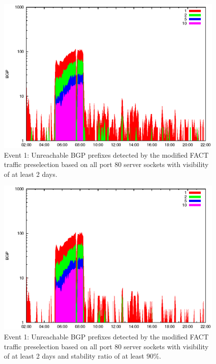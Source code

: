 \begin{figure}
	[p] \centering 
	\includegraphics[width=0.75\linewidth]{images/events/2010_03_25/bgp_log_port80_Set_stab_0_vts_2.eps}
	\caption{Event 1: Unreachable BGP prefixes detected by the modified FACT traffic preselection based on all port 80 server sockets with visibility of at least 2 days.} 
	\label{fig:AMS_IX_FACT_allSES80VTS2} 
\end{figure}

\begin{figure}
	[p] \centering 
	\includegraphics[width=0.75\linewidth]{images/events/2010_03_25/bgp_log_port80_Set_stab_9_vts_2.eps}
	\caption{Event 1: Unreachable BGP prefixes detected by the modified FACT traffic preselection based on all port 80 server sockets with visibility of at least 2 days and stability ratio of at least $90\%$.} 
	\label{fig:AMS_IX_FACT_allSES80VTS2STAB9} 
\end{figure}


